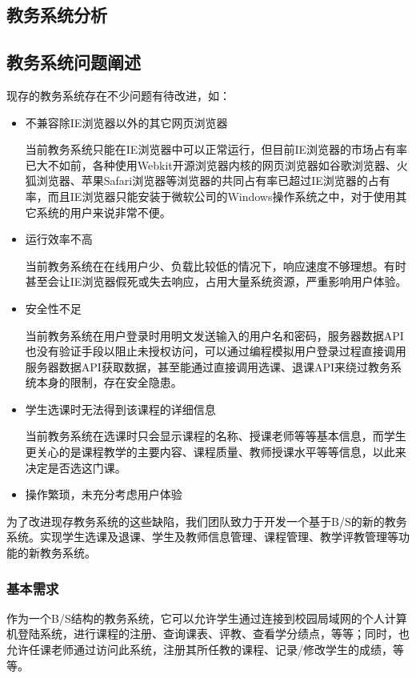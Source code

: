 \begin{center}
  \section{教务系统分析}
\end{center}


\subsection{教务系统问题阐述}
现存的教务系统存在不少问题有待改进，如：

\begin{itemize}
  \item 不兼容除IE浏览器以外的其它网页浏览器
  
  \CJKindent 当前教务系统只能在IE浏览器中可以正常运行，但目前IE浏览器的市场占有率已大不如前，各种使用Webkit开源浏览器内核的网页浏览器如谷歌浏览器、火狐浏览器、苹果Safari浏览器等浏览器的共同占有率已超过IE浏览器的占有率，而且IE浏览器只能安装于微软公司的Windows操作系统\texttrademark 之中，对于使用其它系统的用户来说非常不便。
  
  \item 运行效率不高
  
  \CJKindent 当前教务系统在在线用户少、负载比较低的情况下，响应速度不够理想。有时甚至会让IE浏览器假死或失去响应，占用大量系统资源，严重影响用户体验。
  
  \item 安全性不足
  
  \CJKindent 当前教务系统在用户登录时用明文发送输入的用户名和密码，服务器数据API也没有验证手段以阻止未授权访问，可以通过编程模拟用户登录过程直接调用服务器数据API获取数据，甚至能通过直接调用选课、退课API来绕过教务系统本身的限制，存在安全隐患。
  
  \item 学生选课时无法得到该课程的详细信息
  
  \CJKindent 当前教务系统在选课时只会显示课程的名称、授课老师等等基本信息，而学生更关心的是课程教学的主要内容、课程质量、教师授课水平等等信息，以此来决定是否选这门课。
  
  \item 操作繁琐，未充分考虑用户体验
\end{itemize}

为了改进现存教务系统的这些缺陷，我们团队致力于开发一个基于B/S的新的教务系统。实现学生选课及退课、学生及教师信息管理、课程管理、教学评教管理等功能的新教务系统。

\subsubsection{基本需求}
作为一个B/S结构的教务系统，它可以允许学生通过连接到校园局域网的个人计算机登陆系统，进行课程的注册、查询课表、评教、查看学分绩点，等等；同时，也允许任课老师通过访问此系统，注册其所任教的课程、记录/修改学生的成绩，等等。

